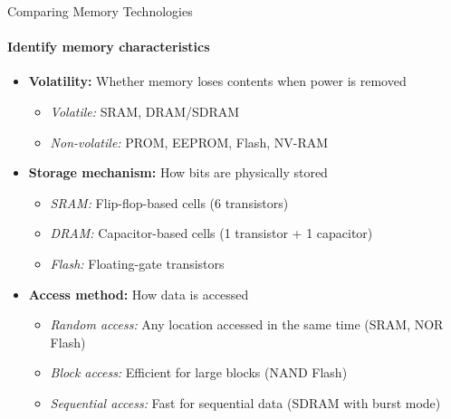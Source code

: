 \begin{KR}{Comparing Memory Technologies}
\paragraph{Identify memory characteristics}
\begin{itemize}
    \item \textbf{Volatility:} Whether memory loses contents when power is removed
    \begin{itemize}
        \item \textit{Volatile:} SRAM, DRAM/SDRAM
        \item \textit{Non-volatile:} PROM, EEPROM, Flash, NV-RAM
    \end{itemize}
    \item \textbf{Storage mechanism:} How bits are physically stored
    \begin{itemize}
        \item \textit{SRAM:} Flip-flop-based cells (6 transistors)
        \item \textit{DRAM:} Capacitor-based cells (1 transistor + 1 capacitor)
        \item \textit{Flash:} Floating-gate transistors
    \end{itemize}
    \item \textbf{Access method:} How data is accessed
    \begin{itemize}
        \item \textit{Random access:} Any location accessed in the same time (SRAM, NOR Flash)
        \item \textit{Block access:} Efficient for large blocks (NAND Flash)
        \item \textit{Sequential access:} Fast for sequential data (SDRAM with burst mode)
    \end{itemize}
\end{itemize}


\end{KR}
